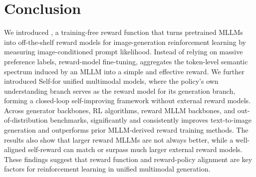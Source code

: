 \section{Conclusion}
\label{sec:conclusion}
We introduced \method, a training-free reward function that turns
pretrained MLLMs into off-the-shelf reward models for image-generation
reinforcement learning by measuring image-conditioned prompt likelihood. 
Instead of relying on massive preference labels, reward-model fine-tuning,
\method aggregates the token-level semantic spectrum induced by an MLLM into a simple and effective reward. 
We further introduced Self-\method for unified multimodal models, 
where the policy's own understanding branch serves as the reward model for its generation branch, 
forming a closed-loop self-improving framework without external reward models. 
Across generator backbones, RL algorithms, reward MLLM backbones, and out-of-distribution benchmarks, 
\method significantly and consistently improves text-to-image generation and 
outperforms prior MLLM-derived reward training methods. 
The results also show that larger reward MLLMs are not always better, 
while a well-aligned self-reward can match or surpass much larger external reward models. 
These findings suggest that reward function and reward-policy alignment are key factors for
reinforcement learning in unified multimodal generation.
